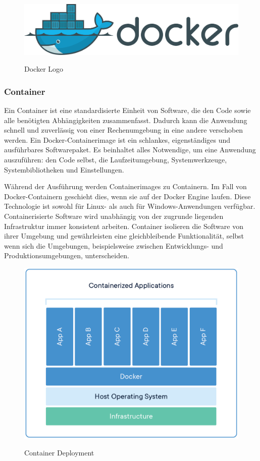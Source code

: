 \begin{figure}[h!]
    \centering
    \includegraphics[width=0.7\linewidth]{pics/docker-logo.png}
    \caption{Docker Logo}
    \label{fig:enter-label}
    \cite{docker_grafik}
\end{figure}

\subsubsection{Container}
Ein Container ist eine standardisierte Einheit von Software, die den Code sowie alle benötigten Abhängigkeiten zusammenfasst. Dadurch kann die Anwendung schnell und zuverlässig von einer Rechenumgebung in eine andere verschoben werden. Ein Docker-Containerimage ist ein schlankes, eigenständiges und ausführbares Softwarepaket. Es beinhaltet alles Notwendige, um eine Anwendung auszuführen: den Code selbst, die Laufzeitumgebung, Systemwerkzeuge, Systembibliotheken und Einstellungen.\newline

Während der Ausführung werden Containerimages zu Containern. Im Fall von Docker-Containern geschieht dies, wenn sie auf der Docker Engine laufen. Diese Technologie ist sowohl für Linux- als auch für Windows-Anwendungen verfügbar. Containerisierte Software wird unabhängig von der zugrunde liegenden Infrastruktur immer konsistent arbeiten. Container isolieren die Software von ihrer Umgebung und gewährleisten eine gleichbleibende Funktionalität, selbst wenn sich die Umgebungen, beispielsweise zwischen Entwicklungs- und Produktionsumgebungen, unterscheiden.

\begin{figure}[h!]
    \centering
    \includegraphics[width=0.7\linewidth]{pics/docker-container.png}
    \caption{Container Deployment}
    \label{fig:enter-label}
    \cite{container_dep_grafik}
\end{figure}

\cite{Vorteile_Nachteile_Docker}
\cite{Was_ist_Docker}




